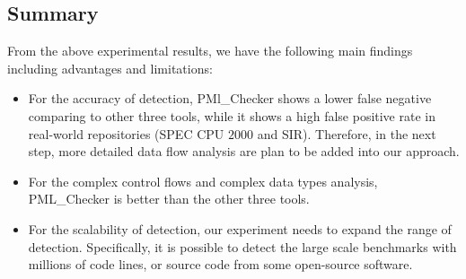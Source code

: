 \subsection{Summary}
From the above experimental results, we have the following main findings including advantages and limitations: 
\begin{itemize}
\item 
For the accuracy of detection, PMl\_Checker shows a lower false negative comparing to other three tools, while it shows a high false positive rate in real-world repositories (SPEC CPU $2000$ and SIR). Therefore, in the next step, more detailed data flow analysis are plan to be added into our approach.
\item 
For the complex control flows and complex data types analysis, PML\_Checker is better than the other three tools.
\item 
For the scalability of detection, our experiment needs to expand the range of detection. Specifically, it is possible to detect the large scale benchmarks with millions of code lines, or source code from some open-source software.
\end{itemize}
